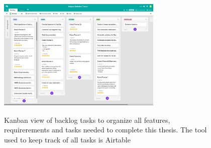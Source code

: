 \begin{center}
\begin{figure}[H]
\centering
\includegraphics[width=0.7\textwidth]{images/task-backlog-airtable.png}\\
\caption{Kanban view of backlog tasks to organize all features, requirerements and tasks needed to complete this thesis. The tool used to keep track of all tasks is Airtable}
\end{figure}
\end{center}